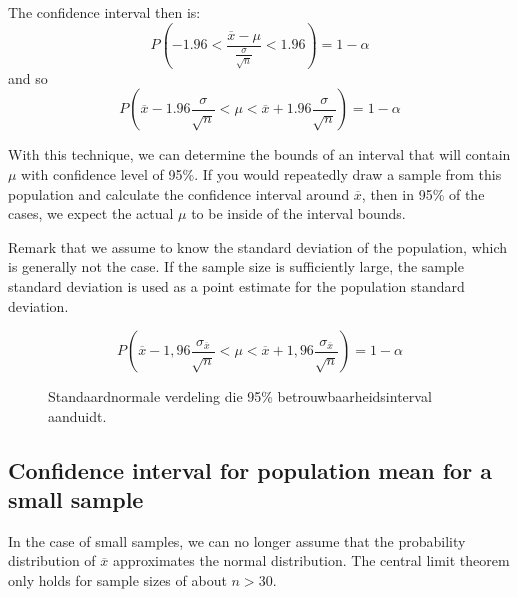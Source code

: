 The confidence interval then is:
\[ P( -1.96 < \frac{\overline{x} - \mu}{\frac{\sigma}{\sqrt{n}}} < 1.96 ) = 1 - \alpha\]
and so
\[ P ( \overline{x} -1.96 \frac{\sigma}{\sqrt{n}} <\mu < \overline{x} + 1.96 \frac{\sigma}{\sqrt{n}}) = 1 - \alpha \]

With this technique, we can determine the bounds of an interval that will contain $\mu$ with confidence level of 95\%. If you would repeatedly draw a sample from this population and calculate the confidence interval around $\overline{x}$, then in 95\% of the cases, we expect the actual $\mu$ to be inside of the interval bounds.

Remark that we assume to know the standard deviation of the population, which is generally not the case. If the sample size is sufficiently large, the sample standard deviation is used as a point estimate for the population standard deviation.

\[ P ( \overline{x} -1,96 \frac{\sigma_{\overline{x}}}{\sqrt{n}} < \mu < \overline{x} + 1,96 \frac{\sigma_{\overline{x}}}{\sqrt{n}}) = 1 - \alpha \]


\begin{figure}
\centering
{}
\caption{Standaardnormale verdeling die 95\% betrouwbaarheidsinterval aanduidt.}
\label{fig:verdelingStandaardnormaal}
\end{figure}

\subsection{Confidence interval for population mean for a small sample}
\label{ssec:confidence-interval-pop-mean-small-sample}

In the case of small samples, we can no longer assume that the probability distribution of $\overline{x}$ approximates the normal distribution. The central limit theorem only holds for sample sizes of about $n > 30$.

